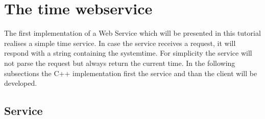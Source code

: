 \chapter{The time webservice}


The first implementation of a Web Service which will be presented in this tutorial realises a simple time service.
In case the service receives a request, it will respond with a string containing the systemtime.
For simplicity the service will not parse the request but always return the current time.
In the following subsections the C++ implementation first the service and than the client will be developed.


\section{Service}

